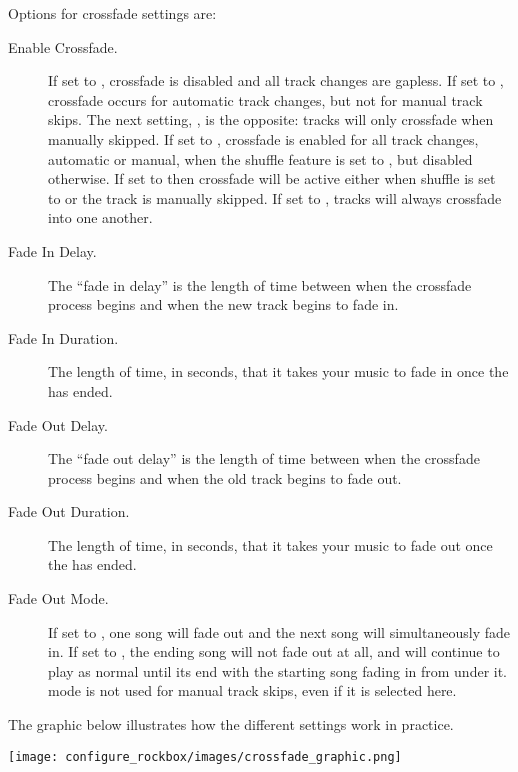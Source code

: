 {  Options for crossfade settings are:
  \begin{description}
    \item[Enable Crossfade.] If set to , crossfade is disabled
      and all track changes are gapless.  If set to
      , crossfade occurs for automatic
      track changes, but not for manual track skips.  The next setting,
      , is the opposite: tracks will only
      crossfade when manually skipped.  If set to , crossfade
      is enabled for all track changes, automatic or manual, when the shuffle
      feature is set to , but disabled otherwise.  If set to
       then crossfade will be active
      either when shuffle is set to  or the track is manually
      skipped.  If set to , tracks will always crossfade into
      one another.
    \item[Fade In Delay.] The ``fade in delay'' is the length of time between
      when the crossfade process begins and when the new track begins to fade
      in.
    \item[Fade In Duration.] The length of time, in seconds, that it takes
      your music to fade in once the  has ended.
    \item[Fade Out Delay.] The ``fade out delay'' is the length of time
      between when the crossfade process begins and when the old track begins
      to fade out.
    \item[Fade Out Duration.] The length of time, in seconds, that it takes
      your music to fade out once the  has ended.
    \item[Fade Out Mode.] If set to , one song will fade
      out and the next song will simultaneously fade in. If set to 
      , the ending song will not fade out at all, and will
      continue to play as normal until its end with the starting song fading
      in from under it.  mode is not used for manual track skips,
      even if it is selected here.
    \end{description}
      

        The graphic below illustrates how the different settings work in practice.

       {\texttt{[image: configure\_rockbox/images/crossfade\_graphic.png]}}
  }%
    

